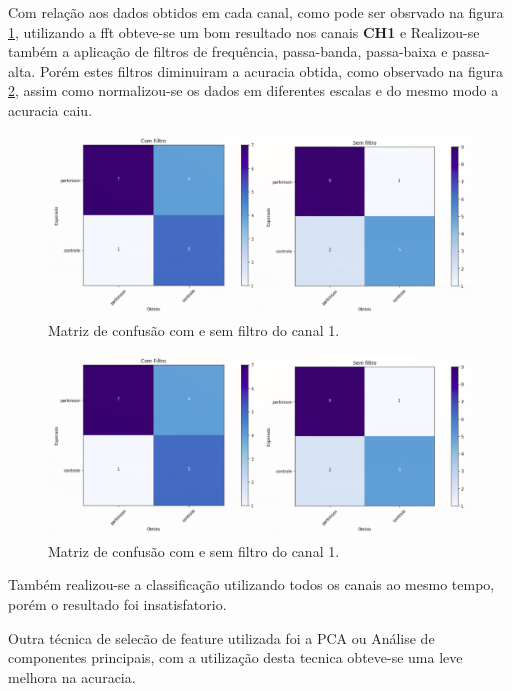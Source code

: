 Com relação aos dados obtidos em cada canal, como pode ser obsrvado na figura \ref{fcomparativo}, utilizando a fft obteve-se um bom resultado nos canais \textbf{CH1} e
Realizou-se também a aplicação de filtros de frequência, passa-banda, passa-baixa e passa-alta.  Porém estes filtros diminuiram a acuracia obtida, como observado na figura \ref{comesemfiltro}, assim como normalizou-se os dados em diferentes escalas e do mesmo modo a acuracia caiu.

\begin{figure}[!htb]
	\centering
	\includegraphics[width=1.1\textwidth]{figuras/comesemfiltro.eps}
	\caption{Matriz de confusão com e sem filtro do canal 1.}
	\label{fcomparativo}
\end{figure}

\begin{figure}[!htb]
	\centering
	\includegraphics[width=1.1\textwidth]{figuras/comesemfiltro.eps}
	\caption{Matriz de confusão com e sem filtro do canal 1.}
	\label{comesemfiltro}
\end{figure}

Também realizou-se a classificação utilizando todos os canais ao mesmo tempo, porém o resultado foi insatisfatorio.

Outra técnica de selecão de feature utilizada foi a PCA ou Análise de componentes principais, com a utilização desta tecnica obteve-se uma leve melhora na acuracia.


